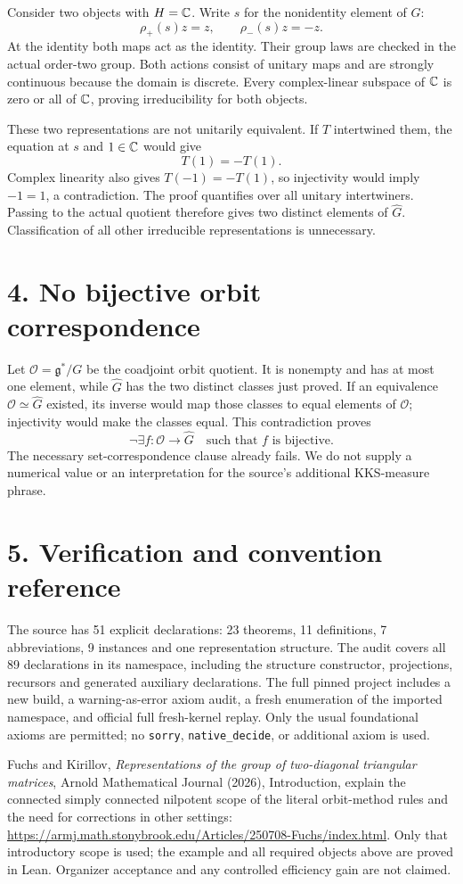 \documentclass[10pt]{article}
\begin{document}
Consider two objects with $H=\mathbb C$. Write $s$ for the nonidentity element of $G$:
\[
\rho_+(s)z=z,\qquad \rho_-(s)z=-z.
\]
At the identity both maps act as the identity. Their group laws are checked in the actual order-two group. Both actions consist of unitary maps and are strongly continuous because the domain is discrete. Every complex-linear subspace of $\mathbb C$ is zero or all of $\mathbb C$, proving irreducibility for both objects.

These two representations are not unitarily equivalent. If $T$ intertwined them, the equation at $s$ and $1\in\mathbb C$ would give
\[
T(1)=-T(1).
\]
Complex linearity also gives $T(-1)=-T(1)$, so injectivity would imply $-1=1$, a contradiction. The proof quantifies over all unitary intertwiners. Passing to the actual quotient therefore gives two distinct elements of $\widehat G$. Classification of all other irreducible representations is unnecessary.

\section*{4. No bijective orbit correspondence}
Let $\mathcal O=\mathfrak g^*/G$ be the coadjoint orbit quotient. It is nonempty and has at most one element, while $\widehat G$ has the two distinct classes just proved. If an equivalence $\mathcal O\simeq\widehat G$ existed, its inverse would map those classes to equal elements of $\mathcal O$; injectivity would make the classes equal. This contradiction proves
\[
\neg\exists f:\mathcal O\longrightarrow\widehat G
\quad\text{such that }f\text{ is bijective}.
\]
The necessary set-correspondence clause already fails. We do not supply a numerical value or an interpretation for the source's additional KKS-measure phrase.

\section*{5. Verification and convention reference}
The source has 51 explicit declarations: 23 theorems, 11 definitions, 7 abbreviations, 9 instances and one representation structure. The audit covers all 89 declarations in its namespace, including the structure constructor, projections, recursors and generated auxiliary declarations. The full pinned project includes a new build, a warning-as-error axiom audit, a fresh enumeration of the imported namespace, and official full fresh-kernel replay. Only the usual foundational axioms are permitted; no \texttt{sorry}, \texttt{native\_decide}, or additional axiom is used.

Fuchs and Kirillov, \emph{Representations of the group of two-diagonal triangular matrices}, Arnold Mathematical Journal (2026), Introduction, explain the connected simply connected nilpotent scope of the literal orbit-method rules and the need for corrections in other settings:
\url{https://armj.math.stonybrook.edu/Articles/250708-Fuchs/index.html}.
Only that introductory scope is used; the example and all required objects above are proved in Lean. Organizer acceptance and any controlled efficiency gain are not claimed.
\end{document}

